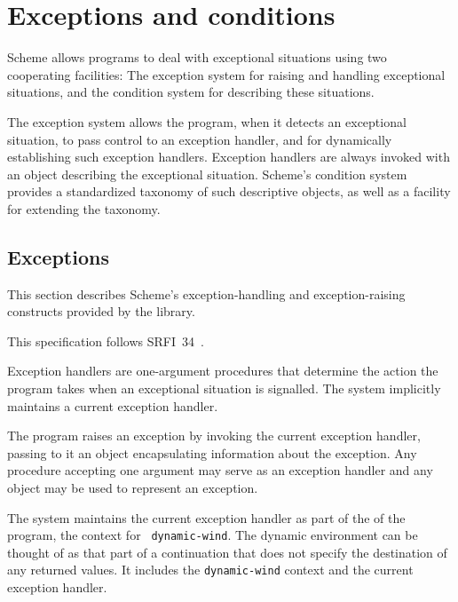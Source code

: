 \chapter{Exceptions and conditions}
\label{exceptionsconditionschapter}

Scheme allows programs to deal with exceptional situations using two
cooperating facilities: The exception system for raising and handling
exceptional situations, and the condition system for describing these
situations.

The exception system allows the program, when it detects an
exceptional situation, to pass control to an exception handler, and
for dynamically establishing such exception handlers.  Exception
handlers are always invoked with an object describing the exceptional
situation.  Scheme's condition system provides a standardized taxonomy
of such descriptive objects, as well as a facility for extending the
taxonomy.

\section{Exceptions}
\label{exceptionssection}

This section describes Scheme's exception-handling and
exception-raising constructs provided by the  library.

\begin{note}
  This specification follows SRFI~34~\cite{srfi34}.
\end{note}

Exception handlers are one-argument procedures that determine the
action the program takes when an exceptional situation is signalled.
The system implicitly maintains a current exception handler.

The program raises an exception
by invoking the current exception handler, passing to it an object
encapsulating information about the exception. Any procedure accepting
one argument may serve as an exception handler and any object may be
used to represent an exception.

The system maintains the current exception handler as part of the
 of the program, the context for {\tt
  dynamic-wind}. The dynamic environment can be thought of as that
part of a continuation that does not specify the destination of any
returned values. It includes the {\tt dynamic-wind} context and the
current exception handler.

